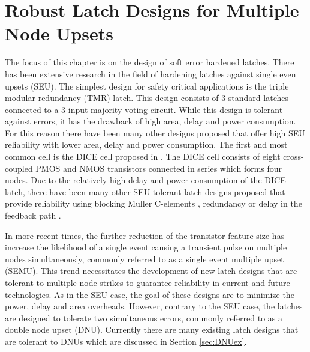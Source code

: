 \chapter{Robust Latch Designs for Multiple Node Upsets}

The focus of this chapter is on the design of soft error hardened latches. There has been extensive research in the field of hardening latches against single even upsets (SEU). The simplest design for safety critical applications is the triple modular redundancy (TMR) latch. This design consists of 3 standard latches connected to a 3-input majority voting circuit. While this design is tolerant against errors, it has the drawback of high area, delay and power consumption. For this reason there have been many other designs proposed that offer high SEU reliability with lower area, delay and power consumption. The first and most common cell is the DICE cell proposed in \cite{DICE}. The DICE cell consists of eight cross-coupled PMOS and NMOS transistors connected in series which forms four nodes. Due to the relatively high delay and power consumption of the DICE latch, there have been many other SEU tolerant latch designs proposed that provide reliability using blocking Muller C-elements \cite{Muller1956}, redundancy or delay in the feedback path \cite{HIPER, FERST, Hazucha, SEMULatch, Multivdd, BISER, NicoFeedback}.

In more recent times, the further reduction of the transistor feature size has increase the likelihood of a single event causing a transient pulse on multiple nodes simultaneously, commonly referred to as a single event multiple upset (SEMU). This trend necessitates the development of new latch designs that are tolerant to multiple node strikes to guarantee reliability in current and future technologies. As in the SEU case, the goal of these designs are to minimize the power, delay and area overheads. However, contrary to the SEU case, the latches are designed to tolerate two simultaneous errors, commonly referred to as a double node upset (DNU). Currently there are many existing latch designs that are tolerant to DNUs which are discussed in Section \ref{sec:DNUex}.   

